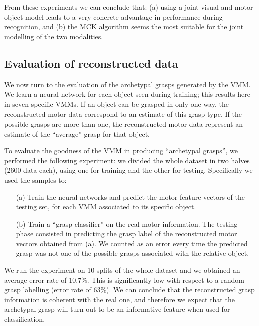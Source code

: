 From these experiments we can conclude that: (a) using a joint visual and motor object model leads to a very concrete 
advantage in performance during recognition, and (b) the MCK algorithm seems the most suitable for the joint 
modelling of the two modalities.

\subsection{Evaluation of reconstructed data}
\label{res:regression}
We now turn to the evaluation of the archetypal grasps generated by the VMM. We learn a neural network for each object seen during training; this results here in seven specific VMMs. If an object can be grasped in
only one way, the reconstructed motor data correspond to an estimate of this
grasp type. If the possible grasps are more than one, the reconstructed motor data
represent an estimate of the ``average'' grasp for that object.

To evaluate the goodness of the VMM in producing ``archetypal grasps'', we performed the following experiment:
 we divided the whole
dataset in two halves (2600 data each), using one for training and the other for testing. Specifically
we used the samples to:
\begin{enumerate}

  \item [(a)] Train the neural networks and predict the motor feature vectors of the
    testing set, for each
VMM associated to its specific object.	

  \item[(b)] Train a ``grasp classifier'' on the real motor information. The testing phase consisted
    in predicting the grasp label of the reconstructed motor vectors obtained from (a).
    We counted as  an error every time the predicted grasp was not one of the possible grasps
    associated with the relative object.

\end{enumerate}

We run the experiment on 10 splits of the whole dataset and we obtained an average error rate of
10.7\%. This is significantly low with respect to a random grasp labelling (error rate of 63\%).
We can conclude that the reconstructed grasp information is coherent with the real one, and therefore we expect 
that the archetypal grasp will turn out to be an informative feature when used for classification. 




